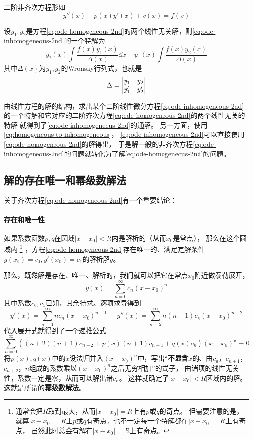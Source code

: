 \documentclass[UTF8]{ctexart}
\begin{document}
二阶非齐次方程形如
\begin{equation}
    y''(x) + p(x) y'(x) + q(x) = f(x)
    \label{eq:ode-inhomogeneous-2nd}
\end{equation}

设$y_1,y_2$是方程\eqref{eq:ode-homogeneous-2nd}的两个线性无关解，则\eqref{eq:ode-inhomogeneous-2nd}的一个特解为
\begin{equation}
    y_2(x) \int \frac{f(x)y_1(x)}{\Delta (x)} \dd x - y_1(x) \int \frac{f(x) y_2(x)}{\Delta(x)}
    \label{eq:homogeneous-to-inhomogeneous}
\end{equation}
其中$\Delta(x)$为$y_1, y_2$的Wronsky行列式，也就是
\[
    \Delta = \mqty | y_1 & y_2 \\ y_1' & y_2' |
\]

由线性方程的解的结构，求出某个二阶线性微分方程\eqref{eq:ode-inhomogeneous-2nd}的一个特解和它对应的二阶齐次方程\eqref{eq:ode-homogeneous-2nd}的两个线性无关的特解
就得到了\eqref{eq:ode-inhomogeneous-2nd}的通解。
另一方面，使用\eqref{eq:homogeneous-to-inhomogeneous}，
\eqref{eq:ode-inhomogeneous-2nd}可以直接使用\eqref{eq:ode-homogeneous-2nd}的解得出，
于是解一般的非齐次方程\eqref{eq:ode-inhomogeneous-2nd}的问题就转化为了解\eqref{eq:ode-homogeneous-2nd}的问题。

\subsection{解的存在唯一和幂级数解法}
关于齐次方程\eqref{eq:ode-homogeneous-2nd}有一个重要结论：
\paragraph{存在和唯一性} 如果系数函数$p, q$在圆域$|x - x_0| < R$内是解析的（从而$x_0$是常点），
那么在这个圆域内%
\footnote{
    通常会把$R$取到最大，从而$|x-x_0|=R$上有$p$或$q$的奇点。
    但需要注意的是，就算$|x-x_0|=R$上$p$或$q$有奇点，也不一定每一个特解都在$|x-x_0|=R$上有奇点，
    虽然此时总会有解在$|x-x_0|=R$上有奇点。%
}
，方程\eqref{eq:ode-homogeneous-2nd}存在唯一的、满足定解条件$y(x_0)=c_0,y'(x_0)=c_1$的解析解$y$。

那么，既然解是存在、唯一、解析的，我们就可以把它在常点$x_0$附近做泰勒展开，
\[
    y(x) = \sum_{n=0}^\infty c_n (x - x_0)^n
\]
其中系数$c_0, c_1$已知，其余待求。逐项求导得到
\[
    y'(x) = \sum_{n=1}^\infty n c_n (x - x_0)^{n-1}, \quad y''(x) = \sum_{n=2}^\infty n(n-1) c_n (x - x_0)^{n-2}
\]
代入展开式就得到了一个递推公式
\begin{equation}
    \sum_{n=0}^\infty \left( (n+2)(n+1)c_{n+2} + p(x) (n+1) c_{n+1} + q(x) c_n \right) (x - x_0)^n = 0
    \label{eq:power-series}
\end{equation}
将$p(x), q(x)$中的$x$设法归并入$(x-x_0)^n$中，写出“\textbf{不显含$x$}的、由$c_n$，$c_{n+1}$，$c_{n+2}$，$n$组成的系数乘以$(x-x_0)^n$之后无穷相加”的式子，
由诸项的线性无关性，系数一定是零，从而可以解出诸$c_n$。
这样就确定了$|x - x_0| < R$区域内的解。这就是所谓的\textbf{幂级数解法}。
\end{document}
